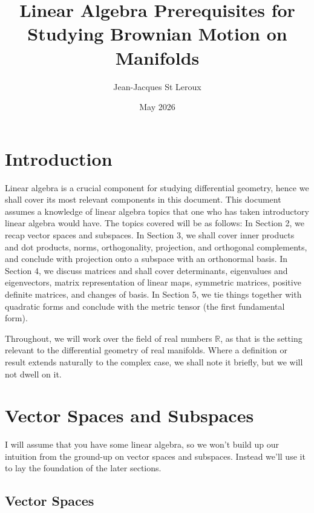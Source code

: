 \documentclass{article}
\title{Linear Algebra Prerequisites for Studying Brownian Motion on Manifolds}
\author{Jean-Jacques St Leroux}
\date{May 2026}
\begin{document}
\maketitle

\section{Introduction}
Linear algebra is a crucial component for studying differential geometry, hence we shall cover its most relevant components in this document. This document assumes a knowledge of linear algebra topics that one who has taken introductory linear algebra would have. The topics covered will be as follows: In Section 2, we recap vector spaces and subspaces. In Section 3, we shall cover inner products and dot products, norms, orthogonality, projection, and orthogonal complements, and conclude with projection onto a subspace with an orthonormal basis. In Section 4, we discuss matrices and shall cover determinants, eigenvalues and eigenvectors, matrix representation of linear maps, symmetric matrices, positive definite matrices, and changes of basis. In Section 5, we tie things together with quadratic forms and conclude with the metric tensor (the first fundamental form).

Throughout, we will work over the field of real numbers $\mathbb{R}$, as that is the setting relevant to the differential geometry of real manifolds. Where a definition or result extends naturally to the complex case, we shall note it briefly, but we will not dwell on it.

\section{Vector Spaces and Subspaces}

I will assume that you have some linear algebra, so we won't build up our intuition from the ground-up on vector spaces and subspaces. Instead we'll use it to lay the foundation of the later sections.

\subsection{Vector Spaces}
\end{document}
